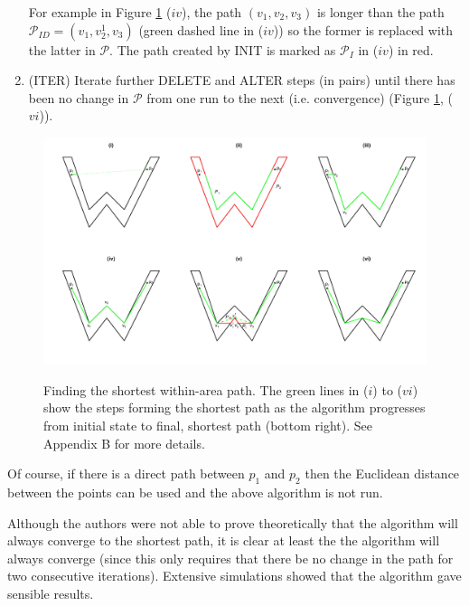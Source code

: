 \documentclass{article}
\begin{document}
\begin{enumerate}
For example in Figure \ref{wdia} ($iv$), the path $(v_1, v_2, v_3)$ is longer than the path $\mathcal{P}_{ID}=(v_1, v^1_2, v_3)$ (green dashed line in ($iv$)) so the former is replaced with the latter in $\mathcal{P}$. The path created by INIT is marked as $\mathcal{P}_{I}$ in  ($iv$) in red.

\item (ITER) Iterate further DELETE and ALTER steps (in pairs) until there has been no change in $\mathcal{P}$ from one run to the next (i.e. convergence) (Figure \ref{wdia}, ($vi$)).
\end{enumerate}

\begin{figure}[p]
\includegraphics[width=\textwidth, trim=0in 0.5in 0in 0.25in]{figs/wdia.pdf} \\
\caption{Finding the shortest within-area path. The green lines in ($i$) to ($vi$) show the steps forming the shortest path as the algorithm progresses from initial state to final, shortest path (bottom right). See Appendix B for more details.}
\label{wdia}
\end{figure}

Of course, if there is a direct path between $p_1$ and $p_2$ then the Euclidean distance between the points can be used and the above algorithm is not run.

Although the authors were not able to prove theoretically that the algorithm will always converge to the shortest path, it is clear at least the the algorithm will always converge (since this only requires that there be no change in the path for two consecutive iterations). Extensive simulations showed that the algorithm gave sensible results.
\end{document}
